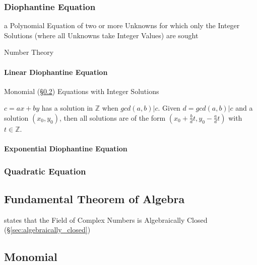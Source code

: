 \subsubsection{Diophantine Equation}\label{sec:diophantine_equation}

a Polynomial Equation of two or more Unknowns for which only the Integer
Solutions (where all Unknowns take Integer Values) are sought

\fist Number Theory



\paragraph{Linear Diophantine Equation}
\label{sec:linear_diophantine}\hfill

Monomial (\S\ref{sec:monomial}) Equations with Integer Solutions

$c = ax + by$ has a solution in $\mathbb{Z}$ when $gcd(a,b)|c$. Given
$d=gcd(a,b)|c$ and a solution $(x_0, y_0)$, then all solutions are of
the form $(x_0 + \frac{b}{d}t, y_0 - \frac{a}{d}t)$ with $t \in
\mathbb{Z}$.



\paragraph{Exponential Diophantine Equation}\hfill
\label{sec:exponential_diophantine}



\subsubsection{Quadratic Equation}\label{sec:quadratic_equation}



\subsection{Fundamental Theorem of Algebra}
\label{sec:fundamental_algebra_theorem}

states that the Field of Complex Numbers is Algebraically Closed
(\S\ref{sec:algebraically_closed})



\subsection{Monomial}\label{sec:monomial}

